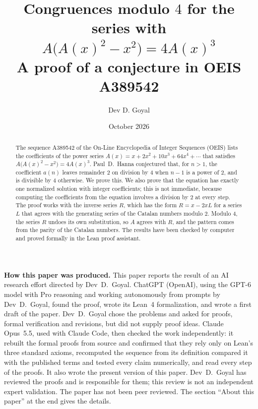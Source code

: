 \documentclass[11pt,a4paper]{article}
\title{Congruences modulo $4$ for the series with $A\bigl(A(x)^2-x^2\bigr)=4A(x)^3$\\[6pt]\large A proof of a conjecture in OEIS A389542}
\author{Dev D. Goyal}
\date{October 2026}
\theoremstyle{definition}
\theoremstyle{remark}
\begin{document}
\maketitle
\begin{abstract}
The sequence A389542 of the On-Line Encyclopedia of Integer Sequences (OEIS) lists the coefficients of the power series
$A(x)=x+2x^2+10x^3+64x^4+\cdots$ that satisfies $A\bigl(A(x)^2-x^2\bigr)=4A(x)^3$. Paul~D.~Hanna conjectured that, for
$n>1$, the coefficient $a(n)$ leaves remainder $2$ on division by $4$ when $n-1$ is a power of $2$, and is divisible by
$4$ otherwise. We prove this. We also prove that the equation has exactly one normalized solution with integer coefficients;
this is not immediate, because computing the coefficients from the equation involves a division by $2$ at every step. The proof
works with the inverse series $R$, which has the form $R=x-2xL$ for a series $L$ that agrees with the generating series
of the Catalan numbers modulo $2$. Modulo $4$, the series $R$ undoes its own substitution, so $A$ agrees with $R$, and the
pattern comes from the parity of the Catalan numbers. The results have been checked by computer and proved formally in
the Lean proof assistant.
\end{abstract}
\begin{center}\begin{minipage}{0.88\linewidth}\small
\textbf{How this paper was produced.} This paper reports the result of an AI research effort directed by
Dev~D.~Goyal. ChatGPT (OpenAI), using the GPT-6 model with Pro reasoning and working autonomously from prompts by
Dev~D.~Goyal, found the proof, wrote its Lean~4 formalization, and wrote a first draft of the paper.
Dev~D.~Goyal chose the problems and asked for proofs, formal verification and revisions, but did not supply proof
ideas. Claude Opus~5.5, used with Claude Code, then checked the work independently: it rebuilt the formal proofs from
source and confirmed that they rely only on Lean's three standard axioms, recomputed the sequence from its definition
compared it with the published terms and tested every claim numerically, and read every step of the proofs. It also wrote the present
version of this paper.
Dev~D.~Goyal has reviewed the proofs and is responsible for them; this review is not an independent expert validation.
The paper has not been peer reviewed.
The section ``About this paper'' at the end gives the details.
\end{minipage}\end{center}
\end{document}

